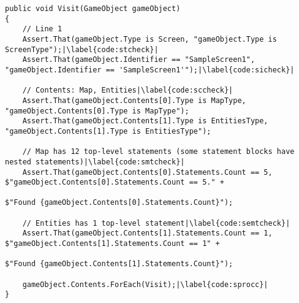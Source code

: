 \begin{lstlisting}[caption={GameObject visitor code for testing the AST Builder}, label={lst:gameobjecttest},escapechar=|, language=CSharp]
public void Visit(GameObject gameObject)
{
    // Line 1
    Assert.That(gameObject.Type is Screen, "gameObject.Type is ScreenType");|\label{code:stcheck}|
    Assert.That(gameObject.Identifier == "SampleScreen1", "gameObject.Identifier == 'SampleScreen1'");|\label{code:sicheck}|
    
    // Contents: Map, Entities|\label{code:sccheck}|
    Assert.That(gameObject.Contents[0].Type is MapType, "gameObject.Contents[0].Type is MapType");
    Assert.That(gameObject.Contents[1].Type is EntitiesType, "gameObject.Contents[1].Type is EntitiesType");

    // Map has 12 top-level statements (some statement blocks have nested statements)|\label{code:smtcheck}|
    Assert.That(gameObject.Contents[0].Statements.Count == 5, $"gameObject.Contents[0].Statements.Count == 5." +
                                                                $"Found {gameObject.Contents[0].Statements.Count}");
    
    // Entities has 1 top-level statement|\label{code:semtcheck}|
    Assert.That(gameObject.Contents[1].Statements.Count == 1, $"gameObject.Contents[1].Statements.Count == 1" +
                                                                $"Found {gameObject.Contents[1].Statements.Count}");
    
    gameObject.Contents.ForEach(Visit);|\label{code:sprocc}|
}
\end{lstlisting}